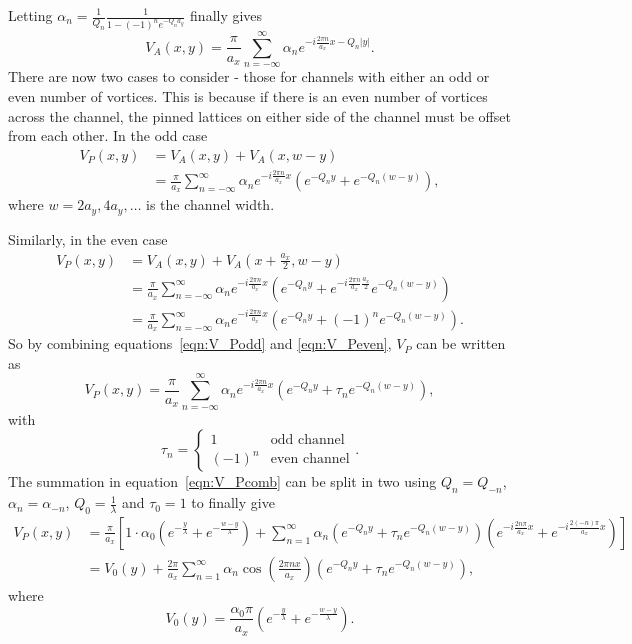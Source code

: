 \documentclass{article}
\numberwithin{equation}{section}
\begin{document}
Letting $\alpha_n = \frac{1}{Q_n}\frac{1}{1-(-1)^ne^{-Q_na_y}}$ finally gives
\begin{equation}
    V_A(x, y) = \frac{\pi}{a_x}\sum_{n=-\infty}^\infty\alpha_n e^{-i\frac{2\pi n}{a_x}x-Q_n|y|}.
\end{equation}
There are now two cases to consider - those for channels with either an odd or even number of vortices. This is because if there is an even number of vortices across the channel, the pinned lattices on either side of the channel must be offset from each other.
In the odd case
\begin{align}
    V_P(x, y) &= V_A(x, y) + V_A(x, w-y) \nonumber \\
    &= \frac{\pi}{a_x}\sum_{n=-\infty}^\infty\alpha_n e^{-i\frac{2\pi n}{a_x}x} \left(e^{-Q_ny}+e^{-Q_n(w-y)}\right), \label{eqn:V_Podd}
\end{align}
where $w = 2a_y, 4a_y, \ldots$ is the channel width.

Similarly, in the even case
\begin{align}
    V_P(x, y) &= V_A(x, y) + V_A(x+\frac{a_x}{2}, w-y) \nonumber \\
    &= \frac{\pi}{a_x}\sum_{n=-\infty}^\infty\alpha_n e^{-i\frac{2\pi n}{a_x}x} \left(e^{-Q_ny}+e^{-i\frac{2\pi n}{a_x}\frac{a_x}{2}}e^{-Q_n(w-y)}\right) \nonumber \\
    &= \frac{\pi}{a_x}\sum_{n=-\infty}^\infty\alpha_n e^{-i\frac{2\pi n}{a_x}x} \left(e^{-Q_ny}+(-1)^ne^{-Q_n(w-y)}\right). \label{eqn:V_Peven}
\end{align}
So by combining equations~\ref{eqn:V_Podd} and \ref{eqn:V_Peven}, $V_P$ can be written as
\begin{equation}
    V_P(x, y) = \frac{\pi}{a_x}\sum_{n=-\infty}^\infty\alpha_n e^{-i\frac{2\pi n}{a_x}x} \left(e^{-Q_ny}+\tau_ne^{-Q_n(w-y)}\right), \label{eqn:V_Pcomb}
\end{equation}
with
\begin{equation}
    \tau_n = \left\{
    \begin{array}{ll}
        1 & \textrm{odd channel} \\
        (-1)^n & \textrm{even channel}
    \end{array}
    \right ..
\end{equation}
The summation in equation~\ref{eqn:V_Pcomb} can be split in two using $Q_n = Q_{-n}$, $\alpha_n = \alpha_{-n}$, $Q_0 = \frac{1}{\lambda}$ and $\tau_0 = 1$ to finally give
\begin{align}
    V_P(x, y) &= \frac{\pi}{a_x} \left[1\cdot\alpha_0\left(e^{-\frac{y}{\lambda}}+e^{-\frac{w-y}{\lambda}}\right) +\sum_{n=1}^\infty\alpha_n\left(e^{-Q_ny}+\tau_ne^{-Q_n(w-y)}\right) \left(e^{-i\frac{2n\pi}{a_x}x}+e^{-i\frac{2(-n)\pi}{a_x}x}\right) \right] \nonumber \\
    &= V_0(y) + \frac{2\pi}{a_x}\sum_{n=1}^\infty\alpha_n\cos\left(\frac{2\pi nx}{a_x}\right) \left(e^{-Q_ny}+\tau_ne^{-Q_n(w-y)}\right), \label{eqn:V_p_final}
\end{align}
where
\begin{equation}
    V_0(y) = \frac{\alpha_0\pi}{a_x}\left(e^{-\frac{y}{\lambda}}+e^{-\frac{w-y}{\lambda}}\right).
\end{equation}
\end{document}
